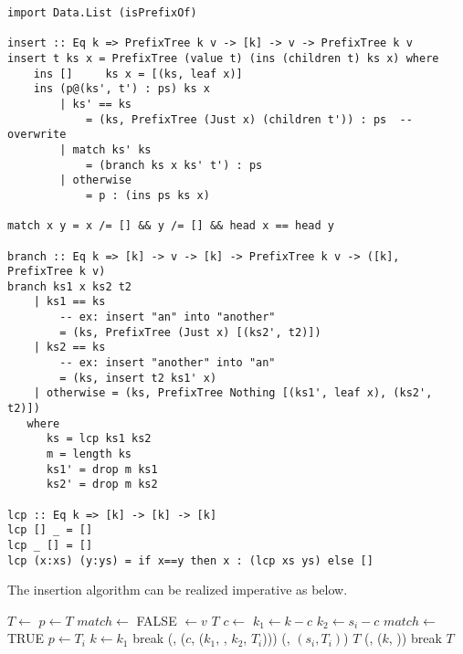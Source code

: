 \documentclass[b5paper]{article}
\begin{document}
\lstset{language=Haskell}
\begin{lstlisting}
import Data.List (isPrefixOf)

insert :: Eq k => PrefixTree k v -> [k] -> v -> PrefixTree k v
insert t ks x = PrefixTree (value t) (ins (children t) ks x) where
    ins []     ks x = [(ks, leaf x)]
    ins (p@(ks', t') : ps) ks x
        | ks' == ks
            = (ks, PrefixTree (Just x) (children t')) : ps  -- overwrite
        | match ks' ks
            = (branch ks x ks' t') : ps
        | otherwise
            = p : (ins ps ks x)

match x y = x /= [] && y /= [] && head x == head y

branch :: Eq k => [k] -> v -> [k] -> PrefixTree k v -> ([k], PrefixTree k v)
branch ks1 x ks2 t2
    | ks1 == ks
        -- ex: insert "an" into "another"
        = (ks, PrefixTree (Just x) [(ks2', t2)])
    | ks2 == ks
        -- ex: insert "another" into "an"
        = (ks, insert t2 ks1' x)
    | otherwise = (ks, PrefixTree Nothing [(ks1', leaf x), (ks2', t2)])
   where
      ks = lcp ks1 ks2
      m = length ks
      ks1' = drop m ks1
      ks2' = drop m ks2

lcp :: Eq k => [k] -> [k] -> [k]
lcp [] _ = []
lcp _ [] = []
lcp (x:xs) (y:ys) = if x==y then x : (lcp xs ys) else []
\end{lstlisting}

The insertion algorithm can be realized imperative as below.

\begin{algorithmic}[1]
   \State $T \gets$ 
  \EndIf
  \State $p \gets T$
  \Loop
    \State $match \gets$ FALSE
        \State {} $\gets v$ 
        \State \Return $T$
      \EndIf
      \State $c \gets$ 
      \State $k_1 \gets k - c$
      \State $k_2 \gets s_i - c$
        \State $match \gets$ TRUE
         
          \State $p \gets T_i$
          \State $k \gets k_1$
          \State break
        \Else {}
          \State {}(, ($c$, ($k_1$, , $k_2$, $T_i$)))
          \State {}(, $(s_i, T_i)$)
          \State \Return $T$
        \EndIf
      \EndIf
    \EndFor
     
      \State {}(, ($k$, ))
      \State break
    \EndIf
  \EndLoop
  \State \Return $T$
\EndFunction
\end{algorithmic}
\end{document}
